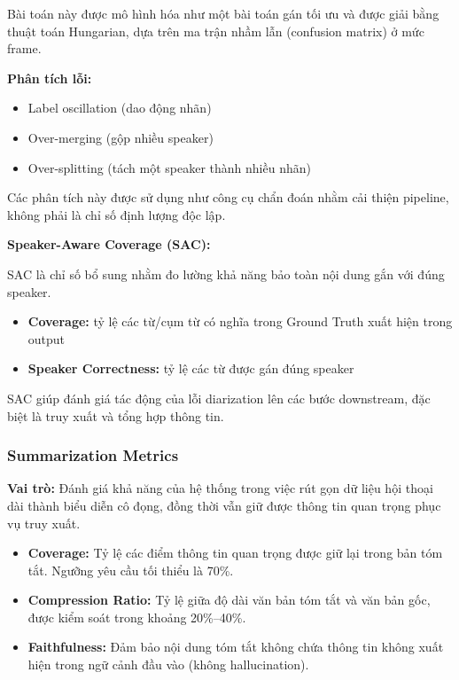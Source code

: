 Bài toán này được mô hình hóa như một bài toán gán tối ưu và được giải bằng thuật toán Hungarian, dựa trên ma trận nhầm lẫn (confusion matrix) ở mức frame.

\textbf{Phân tích lỗi:}
\begin{itemize}
    \item Label oscillation (dao động nhãn)
    \item Over-merging (gộp nhiều speaker)
    \item Over-splitting (tách một speaker thành nhiều nhãn)
\end{itemize}

Các phân tích này được sử dụng như công cụ chẩn đoán nhằm cải thiện pipeline, không phải là chỉ số định lượng độc lập.

\textbf{Speaker-Aware Coverage (SAC):}

SAC là chỉ số bổ sung nhằm đo lường khả năng bảo toàn nội dung gắn với đúng speaker.

\begin{itemize}
    \item \textbf{Coverage:} tỷ lệ các từ/cụm từ có nghĩa trong Ground Truth xuất hiện trong output
    \item \textbf{Speaker Correctness:} tỷ lệ các từ được gán đúng speaker
\end{itemize}

SAC giúp đánh giá tác động của lỗi diarization lên các bước downstream, đặc biệt là truy xuất và tổng hợp thông tin.

\subsubsection{Summarization Metrics}

\textbf{Vai trò:}
Đánh giá khả năng của hệ thống trong việc rút gọn dữ liệu hội thoại dài thành biểu diễn cô đọng, đồng thời vẫn giữ được thông tin quan trọng phục vụ truy xuất.

\begin{itemize}
    \item \textbf{Coverage:} 
    Tỷ lệ các điểm thông tin quan trọng được giữ lại trong bản tóm tắt. 
    Ngưỡng yêu cầu tối thiểu là 70\%.

    \item \textbf{Compression Ratio:} 
    Tỷ lệ giữa độ dài văn bản tóm tắt và văn bản gốc, được kiểm soát trong khoảng 20\%–40\%.

    \item \textbf{Faithfulness:} 
    Đảm bảo nội dung tóm tắt không chứa thông tin không xuất hiện trong ngữ cảnh đầu vào (không hallucination).
\end{itemize}

